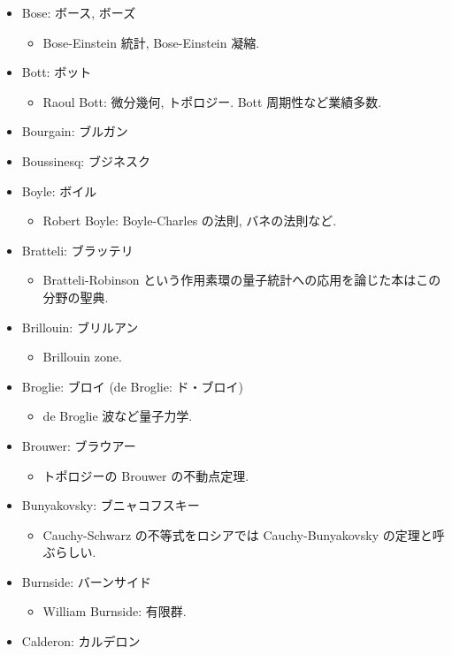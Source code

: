 \documentclass[openany, a4paper, oneside]{jsbook}
\begin{document}
\begin{itemize}
\item Bose: ボース, ボーズ
\begin{itemize}
\item Bose-Einstein 統計, Bose-Einstein 凝縮.
\end{itemize}
\item Bott: ボット
\begin{itemize}
\item Raoul Bott: 微分幾何, トポロジー. Bott 周期性など業績多数.
\end{itemize}
\item Bourgain: ブルガン
\item Boussinesq: ブジネスク
\item Boyle: ボイル
\begin{itemize}
\item Robert Boyle: Boyle-Charles の法則, バネの法則など.
\end{itemize}
\item Bratteli: ブラッテリ
\begin{itemize}
\item Bratteli-Robinson という作用素環の量子統計への応用を論じた本はこの分野の聖典.
\end{itemize}
\item Brillouin: ブリルアン
\begin{itemize}
\item Brillouin zone.
\end{itemize}
\item Broglie: ブロイ (de Broglie: ド・ブロイ)
\begin{itemize}
\item de Broglie 波など量子力学.
\end{itemize}
\item Brouwer: ブラウアー
\begin{itemize}
\item トポロジーの Brouwer の不動点定理.
\end{itemize}
\item Bunyakovsky: ブニャコフスキー
\begin{itemize}
\item Cauchy-Schwarz の不等式をロシアでは Cauchy-Bunyakovsky の定理と呼ぶらしい.
\end{itemize}
\item Burnside: バーンサイド
\begin{itemize}
\item William Burnside: 有限群.
\end{itemize}
\item Calderon: カルデロン

\end{itemize}
\end{document}
